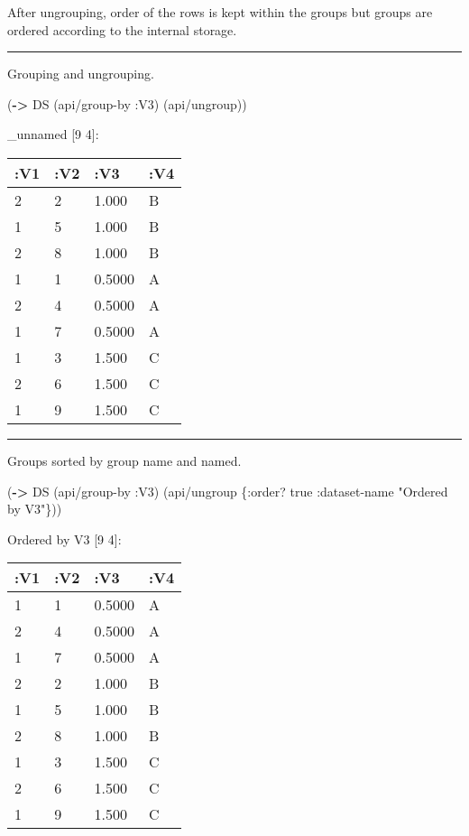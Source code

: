 \documentclass[]{article}
\newenvironment{Shaded}{\begin{snugshade}}{\end{snugshade}}
\newcommand{\KeywordTok}[1]{\textcolor[rgb]{0.13,0.29,0.53}{\textbf{#1}}}
\newcommand{\StringTok}[1]{\textcolor[rgb]{0.31,0.60,0.02}{#1}}
\newcommand{\VariableTok}[1]{\textcolor[rgb]{0.00,0.00,0.00}{#1}}
\newcommand{\AttributeTok}[1]{\textcolor[rgb]{0.77,0.63,0.00}{#1}}
\newcommand{\NormalTok}[1]{#1}
\begin{document}
After ungrouping, order of the rows is kept within the groups but groups
are ordered according to the internal storage.

\begin{center}\rule{0.5\linewidth}{0.5pt}\end{center}

Grouping and ungrouping.

\begin{Shaded}
\begin{Highlighting}[]
\NormalTok{(}\KeywordTok{->}\NormalTok{ DS}
\NormalTok{    (api/group-by }\AttributeTok{:V3}\NormalTok{)}
\NormalTok{    (api/ungroup))}
\end{Highlighting}
\end{Shaded}

\_unnamed {[}9 4{]}:

\begin{longtable}[]{@{}llll@{}}
\toprule
:V1 & :V2 & :V3 & :V4\tabularnewline
\midrule
\endhead
2 & 2 & 1.000 & B\tabularnewline
1 & 5 & 1.000 & B\tabularnewline
2 & 8 & 1.000 & B\tabularnewline
1 & 1 & 0.5000 & A\tabularnewline
2 & 4 & 0.5000 & A\tabularnewline
1 & 7 & 0.5000 & A\tabularnewline
1 & 3 & 1.500 & C\tabularnewline
2 & 6 & 1.500 & C\tabularnewline
1 & 9 & 1.500 & C\tabularnewline
\bottomrule
\end{longtable}

\begin{center}\rule{0.5\linewidth}{0.5pt}\end{center}

Groups sorted by group name and named.

\begin{Shaded}
\begin{Highlighting}[]
\NormalTok{(}\KeywordTok{->}\NormalTok{ DS}
\NormalTok{    (api/group-by }\AttributeTok{:V3}\NormalTok{)}
\NormalTok{    (api/ungroup \{}\AttributeTok{:order}\NormalTok{? }\VariableTok{true}
                  \AttributeTok{:dataset-name} \StringTok{"Ordered by V3"}\NormalTok{\}))}
\end{Highlighting}
\end{Shaded}

Ordered by V3 {[}9 4{]}:

\begin{longtable}[]{@{}llll@{}}
\toprule
:V1 & :V2 & :V3 & :V4\tabularnewline
\midrule
\endhead
1 & 1 & 0.5000 & A\tabularnewline
2 & 4 & 0.5000 & A\tabularnewline
1 & 7 & 0.5000 & A\tabularnewline
2 & 2 & 1.000 & B\tabularnewline
1 & 5 & 1.000 & B\tabularnewline
2 & 8 & 1.000 & B\tabularnewline
1 & 3 & 1.500 & C\tabularnewline
2 & 6 & 1.500 & C\tabularnewline
1 & 9 & 1.500 & C\tabularnewline
\bottomrule
\end{longtable}
\end{document}
